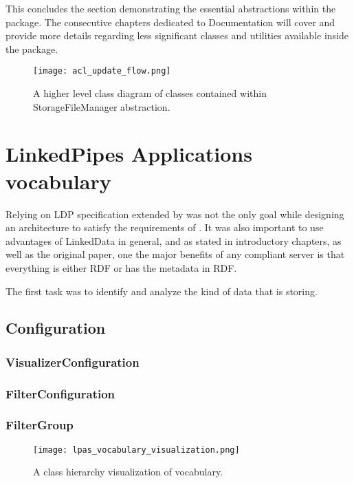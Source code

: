 This concludes the section demonstrating the essential abstractions within the \lpas{} package. The consecutive chapters dedicated to Documentation will cover and provide more details regarding less significant classes and utilities available inside the package.

\begin{figure}[h]
\centering
\texttt{[image: acl\_update\_flow.png]}
\caption{A higher level class diagram of classes contained within StorageFileManager abstraction.}
\label{fig:lps_acl_update_flow}
\end{figure}


\section{LinkedPipes Applications vocabulary}

Relying on LDP specification extended by \solid{} was not the only goal while designing an architecture to satisfy the requirements of \lpa{}. It was also important to use advantages of LinkedData in general, and as stated in introductory chapters, as well as the original paper, one the major benefits of any \solid{} compliant server is that everything is either RDF or has the metadata in RDF.  

The first task was to identify and analyze the kind of data that \lpa{} is storing. 

\subsection{Configuration}
\subsubsection{VisualizerConfiguration}
\subsubsection{FilterConfiguration}
\subsubsection{FilterGroup}

\begin{figure}[h]
\centering
\texttt{[image: lpas\_vocabulary\_visualization.png]}
\caption{A class hierarchy visualization of \lpa{} vocabulary.}
\label{fig:lpas_vocabulary_visualization}
\end{figure}


